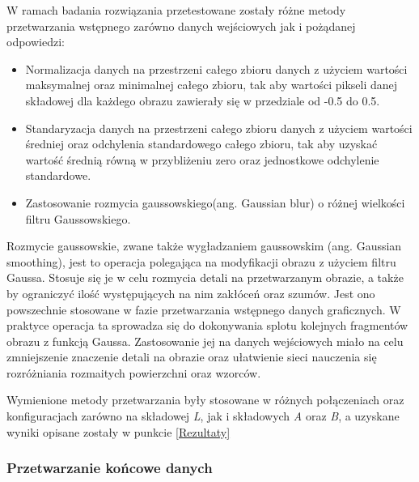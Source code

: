   \noindent
  W ramach badania rozwiązania przetestowane zostały różne metody przetwarzania
  wstępnego zarówno danych wejściowych jak i pożądanej odpowiedzi:
  \begin{itemize}
  \item Normalizacja danych na przestrzeni całego zbioru danych z użyciem wartości
  maksymalnej oraz minimalnej całego zbioru, tak aby wartości pikseli danej składowej
  dla każdego obrazu zawierały się w przedziale od -0.5 do 0.5.
  \item Standaryzacja danych na przestrzeni całego zbioru danych z użyciem wartości
  średniej oraz odchylenia standardowego całego zbioru, tak aby uzyskać wartość
  średnią równą w przybliżeniu zero oraz jednostkowe odchylenie standardowe.
  \item Zastosowanie rozmycia gaussowskiego(ang. Gaussian blur) o różnej
  wielkości filtru Gaussowskiego.
  \end{itemize}

  Rozmycie gaussowskie, zwane także wygładzaniem gaussowskim (ang. Gaussian smoothing),
  jest to operacja polegająca na modyfikacji obrazu z użyciem filtru Gaussa.
  Stosuje się je w celu rozmycia detali na przetwarzanym obrazie, a także by
  ograniczyć ilość występujących na nim zakłóceń oraz szumów. Jest ono powszechnie
  stosowane w fazie przetwarzania wstępnego danych graficznych. W praktyce
  operacja ta sprowadza się do dokonywania splotu kolejnych fragmentów obrazu
  z funkcją Gaussa. Zastosowanie jej na danych wejściowych miało na celu
  zmniejszenie znaczenie detali na obrazie oraz ułatwienie sieci nauczenia się
  rozróżniania rozmaitych powierzchni oraz wzorców.

  Wymienione metody przetwarzania były stosowane w różnych połączeniach oraz
  konfiguracjach zarówno na składowej \textit{L}, jak i składowych \textit{A}
  oraz \textit{B}, a uzyskane wyniki opisane zostały w punkcie \ref{Rezultaty}

\subsubsection{Przetwarzanie końcowe danych}  \label{Przetwarzanie końcowe danych}

